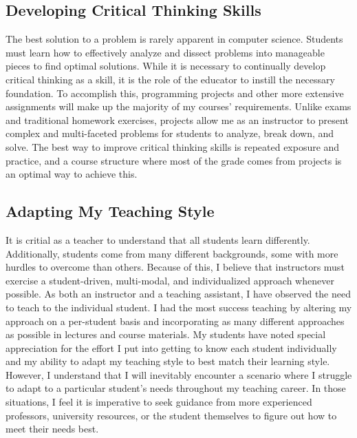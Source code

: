 \subsection*{Developing Critical Thinking Skills}
The best solution to a problem is rarely apparent in computer science. Students must learn how to effectively analyze and dissect problems into manageable pieces to find optimal solutions. While it is necessary to continually develop critical thinking as a skill, it is the role of the educator to instill the necessary foundation. To accomplish this, programming projects and other more extensive assignments will make up the majority of my courses’ requirements. Unlike exams and traditional homework exercises, projects allow me as an instructor to present complex and multi-faceted problems for students to analyze, break down, and solve. The best way to improve critical thinking skills is repeated exposure and practice, and a course structure where most of the grade comes from projects is an optimal way to achieve this.

\subsection*{Adapting My Teaching Style}
It is critial as a teacher to understand that all students learn differently. Additionally, students come from many different backgrounds, some with more hurdles to overcome than others. Because of this, I believe that instructors must exercise a student-driven, multi-modal, and individualized approach whenever possible. As both an instructor and a teaching assistant, I have observed the need to teach to the individual student. I had the most success teaching by altering my approach on a per-student basis and incorporating as many different approaches as possible in lectures and course materials. My students have noted special appreciation for the effort I put into getting to know each student individually and my ability to adapt my teaching style to best match their learning style. However, I understand that I will inevitably encounter a scenario where I struggle to adapt to a particular student's needs throughout my teaching career. In those situations, I feel it is imperative to seek guidance from more experienced professors, university resources, or the student themselves to figure out how to meet their needs best.

